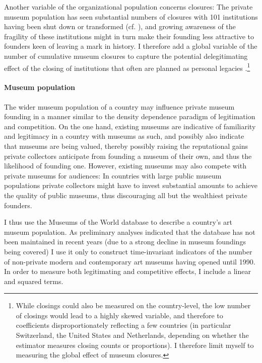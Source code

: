 \documentclass[11pt]{article}
\begin{document}
Another variable of the organizational population concerns closures:
The private museum population has seen substantial numbers of closures with 101 institutions having been shut down or transformed (cf. \cite{Velthuis_Gera_forthcoming_fragility}), and growing awareness of the fragility of these institutions might in turn make their founding less attractive to founders keen of leaving a mark in history.
I therefore add a global variable of the number of cumulative museum closures to capture the potential delegitimating effect of the closing of institutions that often are planned as personal legacies \parencite{Walker_2019_collector}.\footnote{While closings could also be measured on the country-level, the low number of closings would lead to a highly skewed variable, and therefore to coefficients disproportionately reflecting a few countries (in particular Switzerland, the United States and Netherlands, depending on whether the estimator measures closing counts or proportions). I therefore limit myself to measuring the global effect of museum closures.} 




\paragraph*{Museum population}


The wider museum population of a country may influence private museum founding in a manner similar to the density dependence paradigm of legitimation and competition.
On the one hand, existing museums are indicative of familiarity and legitimacy in a country with museums as such, and possibly also indicate that museums are being valued, thereby possibly raising the reputational gains private collectors anticipate from founding a museum of their own, and thus the likelihood of founding one.
However, existing museums may also compete with private museums for audiences:
In countries with large public museum populations private collectors might have to invest substantial amounts to achieve the quality of public museums, thus discouraging all but the wealthiest private founders.


I thus use the Museums of the World database \parencite{deGruyter_2021_MOW} to describe a country's art museum population. 
As preliminary analyses indicated that the database has not been maintained in recent years (due to a strong decline in museum foundings being covered) I use it only to construct time-invariant indicators of the number of non-private modern and contemporary art museums having opened until 1990.
In order to measure both legitimating and competitive effects, I include a linear and squared terms.
\end{document}
